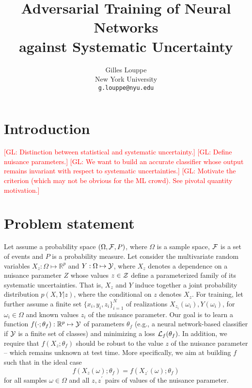 \documentclass{article}
\title{Adversarial Training of Neural Networks\\
against Systematic Uncertainty}
\author{
  Gilles Louppe \\
  New York University\\
  \texttt{g.louppe@nyu.edu} \\
}
\newcommand{\glnote}[1]{\textcolor{red}{[GL: #1]}}
\theoremstyle{plain}
\begin{document}

\maketitle

\begin{abstract}
\end{abstract}

\section{Introduction}

\glnote{Distinction between statistical and systematic uncertainty.}
\glnote{Define nuisance parameters.}
\glnote{We want to build an accurate classifier whose output remains invariant with
respect to systematic uncertainties.}
\glnote{Motivate the criterion (which may not be obvious for the ML crowd). See pivotal quantity motivation.}



\section{Problem statement}
\label{sec:problem}

Let assume a probability space $(\Omega, {\cal F}, P)$, where $\Omega$ is a
sample space, ${\cal F}$ is a set of events and $P$ is a probability measure.
Let consider the multivariate random variables $X_z: \Omega \mapsto
\mathbb{R}^p$ and $Y: \Omega \mapsto {\cal Y}$, where $X_z$ denotes a dependence on a
nuisance parameter $Z$ whose values $z \in {\cal Z}$  define a
parameterized family of its systematic uncertainties. That is, $X_z$ and
$Y$ induce together a joint probability distribution $p(X,Y|z)$, where the
conditional on $z$ denotes $X_z$. For training, let further assume a
finite set $\{ x_i, y_i, z_i \}_{i=1}^N$ of realizations
$X_{z_i}(\omega_i), Y(\omega_i)$, for $\omega_i \in \Omega$ and known
values $z_i$ of the nuisance parameter. Our goal is to learn a function
$f(\cdot;\theta_f) : \mathbb{R}^p \mapsto {\cal Y}$ of parameters $\theta_f$
(e.g., a neural network-based classifier if ${\cal Y}$ is a finite set of
classes) and minimizing  a loss ${\cal L}_f(\theta_f)$. In addition, we require
that $f(X_z ; \theta_f)$ should be robust to the value $z$ of the nuisance parameter  --
which remains unknown at test time. More specifically, we aim at building $f$
such that in the ideal case
\begin{equation}\label{eqn:criterion-true}
f(X_{z}(\omega) ; \theta_f) = f(X_{z^\prime}(\omega) ; \theta_f)
\end{equation} for all
samples $\omega \in \Omega$ and all $z, z^\prime$ pairs of values of the
nuisance parameter.
\end{document}
